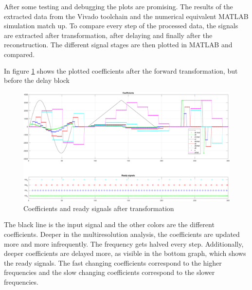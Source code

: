 \begin{refsection}
After some testing and debugging the plots are promising.
The results of the extracted data from the Vivado toolchain and the numerical equivalent MATLAB simulation match up.
To compare every step of the processed data, the signals are extracted after transformation, after delaying and finally after the reconstruction.
The different signal stages are then plotted in MATLAB and compared.

In figure \ref{fpga:fig:coeff} shows the plotted coefficients after the forward transformation, but before the delay block
\begin{figure}
	\centering
	\includegraphics[width=\textwidth]{papers/fpga/images/coefs_with_step.pdf}
	\caption{Coefficients and ready signals after transformation \label{fpga:fig:coeff}}
\end{figure}
The black line is the input signal and the other colors are the different coefficients.
Deeper in the multiresolution analysis, the coefficients are updated more and more infrequently.
The frequency gets halved every step.
Additionally, deeper coefficients are delayed more, as visible in the bottom graph, which shows the ready signals.
The fast changing coefficients correspond to the higher frequencies and the slow changing coefficients correspond to the slower frequencies.


\end{refsection}
